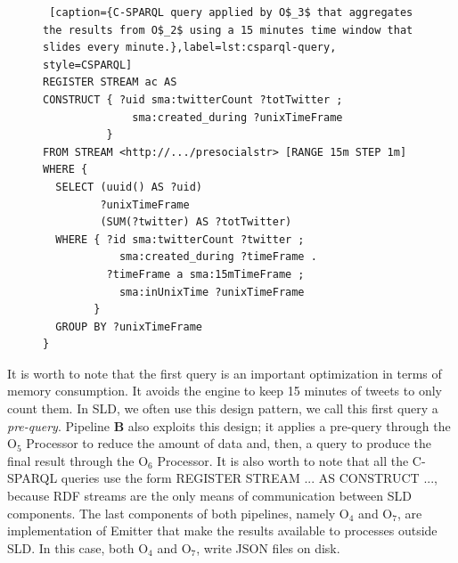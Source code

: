 \begin{figure}[ht]
\begin{minipage}{0.95\linewidth}
\begin{lstlisting} [caption={C-SPARQL query applied by O$_3$ that aggregates the results from O$_2$ using a 15 minutes time window that slides every minute.},label=lst:csparql-query, style=CSPARQL]
REGISTER STREAM ac AS 
CONSTRUCT { ?uid sma:twitterCount ?totTwitter ; 
              sma:created_during ?unixTimeFrame 
          } 
FROM STREAM <http://.../presocialstr> [RANGE 15m STEP 1m] 
WHERE { 
  SELECT (uuid() AS ?uid) 
         ?unixTimeFrame 
         (SUM(?twitter) AS ?totTwitter)
  WHERE { ?id sma:twitterCount ?twitter ; 
            sma:created_during ?timeFrame . 
          ?timeFrame a sma:15mTimeFrame ; 
            sma:inUnixTime ?unixTimeFrame  
        } 
  GROUP BY ?unixTimeFrame 
}
\end{lstlisting}
\end{minipage}
\end{figure}

It is worth to note that the first query is an important optimization in terms of memory consumption. It avoids the engine to keep 15 minutes of tweets to only count them. In SLD, we often use this design pattern, we call this first query a \textit{pre-query}.
Pipeline \textbf{B} also exploits this design; it applies a pre-query through the O$_5$ \textsf{Processor} to reduce the amount of data and, then, a query to produce the final result through the O$_6$ \textsf{Processor}. 
It is also worth to note that all the C-SPARQL queries use the form REGISTER STREAM ... AS CONSTRUCT ..., because RDF streams are the only means of communication between SLD components.
The last components of both pipelines, namely O$_4$ and O$_7$, are implementation of \textsf{Emitter} that make the results available to processes outside SLD. In this case, both O$_4$ and O$_7$, write JSON files on disk.

